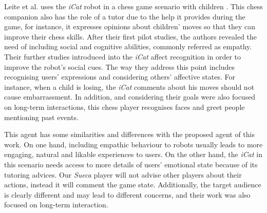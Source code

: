 Leite et al. uses the \emph{iCat} robot in a chess game scenario with children \cite{Leitea,Castellano2010,Leite}.
This chess companion also has the role of a tutor due to the help it provides during the game, for instance, it expresses opinions about children' moves so that they can improve their chess skills.
After their first pilot studies, the authors revealed the need of including social and cognitive abilities, commonly referred as empathy.
Their further studies introduced into the \emph{iCat} affect recognition in order to improve the robot's social cues.
The way they address this point includes recognising users' expressions and considering others' affective states.
For instance, when a child is losing, the \emph{iCat} comments about his moves should not cause embarrassment.
In addition, and considering their goals were also focused on long-term interactions, this chess player recognises faces and greet people mentioning past events.

This agent has some similarities and differences with the proposed agent of this work.
On one hand, including empathic behaviour to robots usually leads to more engaging, natural and likable experiences to users.
On the other hand, the \emph{iCat} in this scenario needs access to more details of users' emotional state because of its tutoring advices. Our \emph{Sueca} player will not advise other players about their actions, instead it will comment the game state.
Additionally, the target audience is clearly different and may lead to different concerns, and their work was also focused on long-term interaction.


